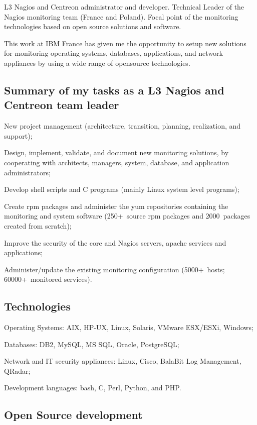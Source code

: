 \noindent
L3 Nagios and Centreon administrator and developer.
Technical Leader of the Nagios monitoring team (France and Poland).
Focal point of the monitoring technologies based on open source solutions and
software.

This work at IBM France has given me the opportunity to setup new solutions 
for monitoring operating systems, databases, applications, and network 
appliances by using a wide range of opensource technologies.

\subsection{Summary of my tasks as a L3 Nagios and Centreon team leader}

\item{\bdot} New project management (architecture, transition, planning, 
   realization, and support);
\item{\bdot} Design, implement, validate, and document new monitoring solutions,
   by cooperating with architects, managers, system, database, and application 
   administrators;
\item{\bdot} Develop shell scripts and C programs (mainly Linux system level
   programs);
\item{\bdot} Create rpm packages and administer the yum repositories containing
   the monitoring and system software (250+~source rpm packages and  
   2000~packages created from scratch);
\item{\bdot} Improve the security of the core and Nagios servers, apache 
   services and applications;
\item{\bdot} Administer/update the existing monitoring configuration 
   (5000+~hosts; 60000+~monitored services).

\subsection{Technologies}

\item{\bdot} Operating Systems: AIX, HP-UX, Linux, Solaris, VMware ESX/ESXi, Windows;
\item{\bdot} Databases: DB2, MySQL, MS SQL, Oracle, PostgreSQL;
\item{\bdot} Network and IT security appliances: Linux, Cisco, BalaBit Log Management, 
   QRadar;
\item{\bdot} Development languages: bash, C, Perl, Python, and PHP.

\subsection{Open Source development}

